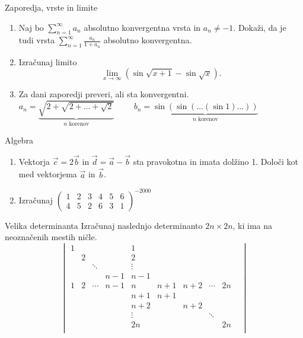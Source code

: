 \begin{frame}{Zaporedja, vrste in limite}
	\begin{enumerate}
		\item 
		Naj bo $\sum_{n=1}^\infty{a_n}$ absolutno konvergentna vrsta in $a_n \ne -1$.
		Dokaži, da je tudi vrsta $\sum_{n=1}^\infty \frac{a_n}{1+a_n}$
		absolutno konvergentna.

		\item
		Izračunaj limito
		$$\lim_{x\to\infty} (\sin \sqrt{x+1} - \sin \sqrt{x}).$$

		\item
		Za dani zaporedji preveri, ali sta konvergentni.
		$a_n = \underbrace{\sqrt{2+\sqrt{2+\dots+\sqrt{2}}}}_{n \text{ korenov}} \qquad$
		$b_n = \underbrace{\sin(\sin(\dots(\sin 1)\dots))}_{n \text{ korenov}} $
		
	\end{enumerate}
\end{frame}

\begin{frame}{Algebra}
	\begin{enumerate}
		\item
		Vektorja $\vec{c} = 2\vec{b}$ in $\vec{d} = \vec{a} - \vec{b}$
		sta pravokotna in imata dolžino 1. Določi kot med vektorjema $\vec{a}$ in $\vec{b}$.
		\item 
		Izračunaj
		$\begin{pmatrix}
			1 & 2 & 3 & 4 & 5 & 6\\
			4 & 5 & 2 & 6 & 3 & 1
		\end{pmatrix}^{-2000}$
	
	\end{enumerate}
\end{frame}

\begin{frame}{Velika determinanta}
	Izračunaj naslednjo determinanto $2n \times 2n$, ki ima na neoznačenih mestih ničle.
	$$\begin{vmatrix}
		1 & & & & 1 & & & & \\
		& 2 & & & 2 & & & & \\
		& &\ddots & & \vdots & & & & &\\
		& & & n-1 & n-1 & & & & \\
		1 & 2 & \cdots & n-1 & n & n+1 & n+2 & \cdots & 2n\\
		& & & & n+1 & n+1 & & & \\
		& & & & n+2 & & n+2 & & \\
		& & & & \vdots & & & \ddots & \\
		& & & & 2n & & & & 2n\\
	\end{vmatrix}$$
\end{frame}

